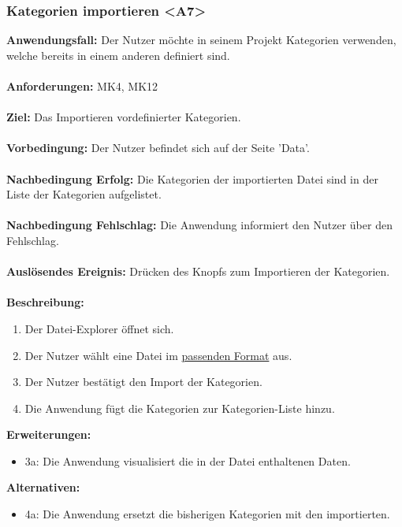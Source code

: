 \documentclass[parskip=full]{scrartcl} %
\begin{document}
\subsubsection*{Kategorien importieren <A7>}
\textbf{Anwendungsfall:} Der Nutzer möchte in seinem Projekt Kategorien verwenden, welche bereits in einem anderen definiert sind.\\\\
\textbf{Anforderungen:} MK4, MK12\\\\
\textbf{Ziel:} Das Importieren vordefinierter Kategorien. \\\\
\textbf{Vorbedingung:} Der Nutzer befindet sich auf der Seite 'Data'. \\\\
\textbf{Nachbedingung Erfolg:} Die Kategorien der importierten Datei sind in der Liste der Kategorien aufgelistet. \\\\
\textbf{Nachbedingung Fehlschlag:} Die Anwendung informiert den Nutzer über den Fehlschlag. \\\\
\textbf{Auslösendes Ereignis:} Drücken des Knopfs zum Importieren der Kategorien.\\\\
\textbf{Beschreibung:}
\begin{enumerate}
    \item Der Datei-Explorer öffnet sich.
    \item Der Nutzer wählt eine Datei im \hyperlink{dataformat}{passenden Format} aus.
    \item Der Nutzer bestätigt den Import der Kategorien.
    \item Die Anwendung fügt die Kategorien zur Kategorien-Liste hinzu.
\end{enumerate}
\textbf{Erweiterungen:} 
\begin{itemize}
    \item 3a: Die Anwendung visualisiert die in der Datei enthaltenen Daten.
\end{itemize}
\textbf{Alternativen:} 
\begin{itemize}
    \item 4a: Die Anwendung ersetzt die bisherigen Kategorien mit den importierten.
\end{itemize}
\newpage
\end{document}
